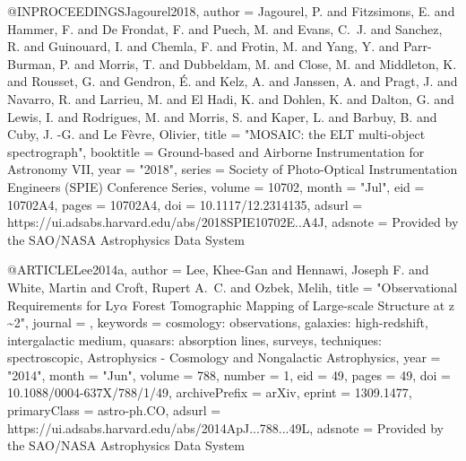 \documentclass{aa}
\begin{document}
{{{{{{{{{{{{{{@INPROCEEDINGS{Jagourel2018,
       author = {{Jagourel}, P. and {Fitzsimons}, E. and {Hammer}, F. and
         {De Frondat}, F. and {Puech}, M. and {Evans}, C.~J. and {Sanchez}, R. and
         {Guinouard}, I. and {Chemla}, F. and {Frotin}, M. and {Yang}, Y. and
         {Parr-Burman}, P. and {Morris}, T. and {Dubbeldam}, M. and {Close}, M. and
         {Middleton}, K. and {Rousset}, G. and {Gendron}, {\'E}. and {Kelz}, A. and
         {Janssen}, A. and {Pragt}, J. and {Navarro}, R. and {Larrieu}, M. and
         {El Hadi}, K. and {Dohlen}, K. and {Dalton}, G. and {Lewis}, I. and
         {Rodrigues}, M. and {Morris}, S. and {Kaper}, L. and {Barbuy}, B. and
         {Cuby}, J. -G. and {Le F{\`e}vre}, Olivier},
        title = "{MOSAIC: the ELT multi-object spectrograph}",
    booktitle = {Ground-based and Airborne Instrumentation for Astronomy VII},
         year = "2018",
       series = {Society of Photo-Optical Instrumentation Engineers (SPIE) Conference Series},
       volume = {10702},
        month = "Jul",
          eid = {10702A4},
        pages = {10702A4},
          doi = {10.1117/12.2314135},
       adsurl = {https://ui.adsabs.harvard.edu/abs/2018SPIE10702E..A4J},
      adsnote = {Provided by the SAO/NASA Astrophysics Data System}
}

@ARTICLE{Lee2014a,
       author = {{Lee}, Khee-Gan and {Hennawi}, Joseph F. and {White}, Martin and
         {Croft}, Rupert A.~C. and {Ozbek}, Melih},
        title = "{Observational Requirements for Ly{\ensuremath{\alpha}} Forest Tomographic Mapping of Large-scale Structure at z \raisebox{-0.5ex}\textasciitilde 2}",
      journal = {\apj},
     keywords = {cosmology: observations, galaxies: high-redshift, intergalactic medium, quasars: absorption lines, surveys, techniques: spectroscopic, Astrophysics - Cosmology and Nongalactic Astrophysics},
         year = "2014",
        month = "Jun",
       volume = {788},
       number = {1},
          eid = {49},
        pages = {49},
          doi = {10.1088/0004-637X/788/1/49},
archivePrefix = {arXiv},
       eprint = {1309.1477},
 primaryClass = {astro-ph.CO},
       adsurl = {https://ui.adsabs.harvard.edu/abs/2014ApJ...788...49L},
      adsnote = {Provided by the SAO/NASA Astrophysics Data System}
}

}}}}}}}}}}}}}}
\end{document}
